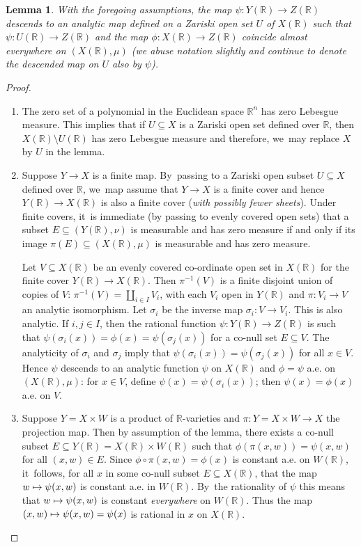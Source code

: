 \documentclass[JEP,XML,SOM,Unicode,published]{cedram}
\def\mto{\mathchoice{\longmapsto}{\mapsto}{\mapsto}{\mapsto}}
\newtheorem{lemma}{Lemma}
\theoremstyle{definition}
\newcommand{\field}[1]{\mathbb{#1}}
\newcommand{\R}{\field{R}}
\begin{document}
\begin{lemma} \label{Rrational} With the foregoing assumptions, the map $\psi:Y(\R)\to Z(\R)$ descends to an \emph{analytic} map defined on a Zariski open set $U$ of $X(\R)$ such that $\psi : U(\R)\to Z(\R)$ and the map $\phi: X(\R) \to Z(\R)$ coincide almost everywhere on $(X(\R), \mu)$ \rm{(}we abuse notation slightly and continue to denote the descended map on $U$ also by $\psi$\rm{)}.
\end{lemma}

\skpt
\begin{proof}
\begin{enumerate}
\item\label{pf:Rrational1}
The zero set of a polynomial in the Euclidean space $\R^n$ has zero Lebesgue measure. This implies that if $U \subseteq X$ is a Zariski open set defined over $\R$, then $X(\R)\setminus U(\R)$ has zero Lebesgue measure and therefore, we~may replace $X$ by $U$ in the lemma.

\item\label{pf:Rrational2}
Suppose $Y \to X$ is a finite map. By~passing to a Zariski open subset $U\subseteq X$ defined over $\R$, we~map assume that $Y \to X$ is a finite cover and hence $Y(\R) \to X(\R)$ is also a finite cover (\emph{with possibly fewer sheets}). Under finite covers, it~is immediate (by passing to evenly covered open sets) that a subset $E\subseteq (Y(\R),\nu)$ is measurable and has zero measure if and only if its image $\pi(E)\subseteq (X(\R),\mu)$ is measurable and has zero measure.

Let $V \subseteq X(\R)$ be an evenly covered co-ordinate open set in $X(\R)$ for the finite cover $Y(\R) \to X(\R)$. Then $\pi ^{-1}(V)$ is a finite disjoint union of copies of $V$: $\pi ^{-1}(V) = \coprod_{i\in I} V_i$, with each $V_i$ open in $Y(\R)$ and $\pi: V_i \to V$ an analytic isomorphism. Let $\sigma_i$ be the inverse map $\sigma_i: V \to V_i$. This is also analytic. If $i, j\in I$, then the rational function $\psi : Y(\R) \to Z(\R)$ is such that $\psi(\sigma_i(x))=\phi (x)=\psi (\sigma_j(x))$ for a co-null set $E\subseteq V$. The analyticity of $\sigma_i$ and $\sigma_j$ imply that $\psi(\sigma_i(x))=\psi (\sigma_j(x))$ for all $x\in V$. Hence $\psi$ descends to an analytic function $\psi$ on $X(\R)$ and $\phi =\psi$ a.e. on $(X(\R),\mu)$: for $x\in V$, define $\psi (x)= \psi(\sigma_i(x))$; then $\psi (x)=\phi (x)$ a.e. on $V$.

\item\label{pf:Rrational3}
Suppose $Y=X\times W$ is a product of $\R$-varieties and $\pi : Y =X\times W \to X$ the projection map. Then by assumption of the lemma, there exists a co-null subset $E\subseteq Y(\R)= X(\R)\times W(\R)$ such that $\phi (\pi (x,w))= \psi (x,w)$ for all $(x,w)\in E$.
Since $\phi \circ \pi (x,w)=\phi (x)$ is constant a.e. on $W(\R)$, it~follows, for all $x$ in some co-null subset $E\subseteq X(\R)$, that the map $w\mto \psi(x,w)$ is constant a.e. in $W(\R)$. By~the rationality of $\psi$ this means that $w\mto \psi (x,w)$ is constant \emph{everywhere} on $W(\R)$. Thus the map $(x,w)\mto \psi (x,w)=\psi (x)$ is rational in $x$ on $X(\R)$.


\end{enumerate}
\end{proof}
\end{document}
